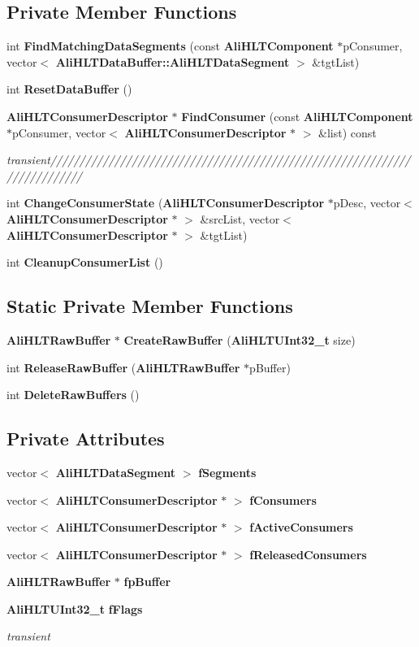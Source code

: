 \subsection*{Private Member Functions}
\begin{CompactItemize}
\item 
int {\bf Find\-Matching\-Data\-Segments} (const {\bf Ali\-HLTComponent} $\ast$p\-Consumer, vector$<$ {\bf Ali\-HLTData\-Buffer::Ali\-HLTData\-Segment} $>$ \&tgt\-List)
\item 
int {\bf Reset\-Data\-Buffer} ()
\item 
{\bf Ali\-HLTConsumer\-Descriptor} $\ast$ {\bf Find\-Consumer} (const {\bf Ali\-HLTComponent} $\ast$p\-Consumer, vector$<$ {\bf Ali\-HLTConsumer\-Descriptor} $\ast$ $>$ \&list) const 
\begin{CompactList}\small\item\em transient/////////////////////////////////////////////////////////////////////////// \item\end{CompactList}\item 
int {\bf Change\-Consumer\-State} ({\bf Ali\-HLTConsumer\-Descriptor} $\ast$p\-Desc, vector$<$ {\bf Ali\-HLTConsumer\-Descriptor} $\ast$ $>$ \&src\-List, vector$<$ {\bf Ali\-HLTConsumer\-Descriptor} $\ast$ $>$ \&tgt\-List)
\item 
int {\bf Cleanup\-Consumer\-List} ()
\end{CompactItemize}
\subsection*{Static Private Member Functions}
\begin{CompactItemize}
\item 
{\bf Ali\-HLTRaw\-Buffer} $\ast$ {\bf Create\-Raw\-Buffer} ({\bf Ali\-HLTUInt32\_\-t} size)
\item 
int {\bf Release\-Raw\-Buffer} ({\bf Ali\-HLTRaw\-Buffer} $\ast$p\-Buffer)
\item 
int {\bf Delete\-Raw\-Buffers} ()
\end{CompactItemize}
\subsection*{Private Attributes}
\begin{CompactItemize}
\item 
vector$<$ {\bf Ali\-HLTData\-Segment} $>$ {\bf f\-Segments}
\item 
vector$<$ {\bf Ali\-HLTConsumer\-Descriptor} $\ast$ $>$ {\bf f\-Consumers}
\item 
vector$<$ {\bf Ali\-HLTConsumer\-Descriptor} $\ast$ $>$ {\bf f\-Active\-Consumers}
\item 
vector$<$ {\bf Ali\-HLTConsumer\-Descriptor} $\ast$ $>$ {\bf f\-Released\-Consumers}
\item 
{\bf Ali\-HLTRaw\-Buffer} $\ast$ {\bf fp\-Buffer}
\item 
{\bf Ali\-HLTUInt32\_\-t} {\bf f\-Flags}
\begin{CompactList}\small\item\em transient \item\end{CompactList}\end{CompactItemize}
